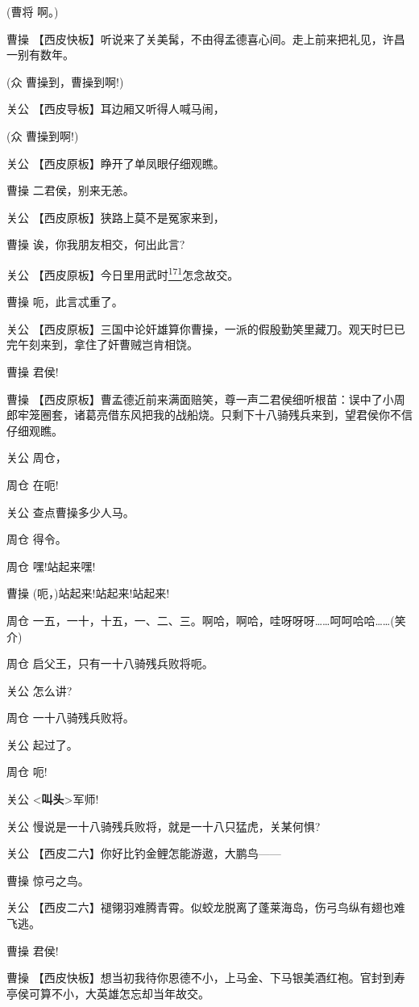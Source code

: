 (曹将 啊。)

曹操
【西皮快板】听说来了关美髯，不由得孟德喜心间。走上前来把礼见，许昌一别有数年。

(众 曹操到，曹操到啊!)

关公 【西皮导板】耳边厢又听得人喊马闹，

(众 曹操到啊!)

关公 【西皮原板】睁开了单凤眼仔细观瞧。

曹操 二君侯，别来无恙。

关公 【西皮原板】狭路上莫不是冤家来到，

曹操 诶，你我朋友相交，何出此言?

关公
【西皮原板】今日里用武时\protect\hyperlink{fn171}{\textsuperscript{171}}怎念故交。

曹操 呃，此言忒重了。

关公
【西皮原板】三国中论奸雄算你曹操，一派的假殷勤笑里藏刀。观天时巳已完午刻来到，拿住了奸曹贼岂肯相饶。

曹操 君侯!

曹操
【西皮原板】曹孟德近前来满面赔笑，尊一声二君侯细听根苗：误中了小周郎牢笼圈套，诸葛亮借东风把我的战船烧。只剩下十八骑残兵来到，望君侯你不信仔细观瞧。

关公 周仓，

周仓 在呃!

关公 查点曹操多少人马。

周仓 得令。

周仓 嘿!站起来嘿!

曹操 (呃，)站起来!站起来!站起来!

周仓
一五，一十，十五，一、二、三。啊哈，啊哈，哇呀呀呀\ldots{}\ldots{}呵呵哈哈\ldots{}\ldots{}(笑介)

周仓 启父王，只有一十八骑残兵败将呃。

关公 怎么讲?

周仓 一十八骑残兵败将。

关公 起过了。

周仓 呃!

关公 \textless{}\textbf{叫头}\textgreater{}军师!

关公 慢说是一十八骑残兵败将，就是一十八只猛虎，关某何惧?

关公 【西皮二六】你好比钓金鲤怎能游遨，大鹏鸟------

曹操 惊弓之鸟。

关公
【西皮二六】褪翎羽难腾青霄。似蛟龙脱离了蓬莱海岛，伤弓鸟纵有翅也难飞逃。

曹操 君侯!

曹操
【西皮快板】想当初我待你恩德不小，上马金、下马银美酒红袍。官封到寿亭侯可算不小，大英雄怎忘却当年故交。

